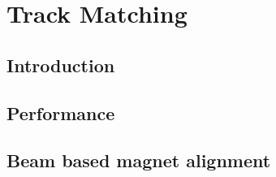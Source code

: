 \graphicspath{{08-Track-matching/Figures/}}

\section{Track Matching}
\label{Sect:TM}

\subsection{Introduction}
\label{SubSect:TM_Intro}

\subsection{Performance}
\label{SubSect:TM_Performance}

\subsection{Beam based magnet alignment}
\label{SubSect:TM_Magnet_Alignment}

